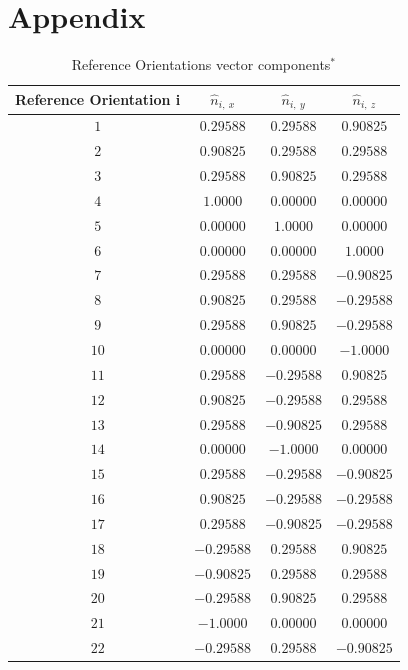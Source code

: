 \documentclass[final, 3p]{elsarticle}
\begin{document}
\section*{Appendix}
\setcounter{table}{0}
\renewcommand{\thetable}{A\arabic{table}}
\label{sec:App1}
\begin{table}[h]
	\label{tab:A1}
	\begin{center}
		\caption{Reference Orientations vector components$^*$}
		\begin{tabular}{|c|c|c|c|}
			\hline\hline
			Reference Orientation i & $\hat{n}_{i,\ x}$ &  $\hat{n}_{i,\ y}$ &  $\hat{n}_{i,\ z}$ \\
			\hline
			$1$ & $ 0.29588$ &  $ 0.29588$ & $ 0.90825$ \\
			$2$ & $ 0.90825$ &  $ 0.29588$ & $ 0.29588$ \\
			$3$ & $ 0.29588$ &  $ 0.90825$ & $ 0.29588$ \\
			$4$ & $1.0000$ &  $0.00000$ & $0.00000$ \\
			$5$ & $0.00000$ &  $1.0000$ & $0.00000$ \\
			$6$ & $0.00000$ &  $0.00000$ & $1.0000$ \\
			$7$ & $ 0.29588$ &  $ 0.29588$ & $-0.90825$ \\
			$8$ & $ 0.90825$ &  $ 0.29588$ & $-0.29588$ \\
			$9$ & $ 0.29588$ &  $ 0.90825$ & $-0.29588$ \\
			$10$ & $0.00000$ &  $0.00000$ & $-1.0000$ \\
			$11$ & $ 0.29588$ &  $-0.29588$ & $ 0.90825$ \\
			$12$ & $ 0.90825$ &  $-0.29588$ & $ 0.29588$ \\
			$13$ & $ 0.29588$ &  $-0.90825$ & $ 0.29588$ \\
			$14$ & $0.00000$ &  $-1.0000$ & $0.00000$ \\
			$15$ & $ 0.29588$ &  $-0.29588$ & $-0.90825$ \\
			$16$ & $ 0.90825$ &  $-0.29588$ & $-0.29588$ \\
			$17$ & $ 0.29588$ &  $-0.90825$ & $-0.29588$ \\
			$18$ & $-0.29588$ &  $ 0.29588$ & $ 0.90825$ \\
			$19$ & $-0.90825$ &  $ 0.29588$ & $ 0.29588$ \\
			$20$ & $-0.29588$ &  $ 0.90825$ & $ 0.29588$ \\
			$21$ & $-1.0000$ &  $0.00000$ & $0.00000$ \\
			$22$ & $-0.29588$ &  $ 0.29588$ & $-0.90825$ \\

\end{tabular}
\end{center}
\end{table}
\end{document}
